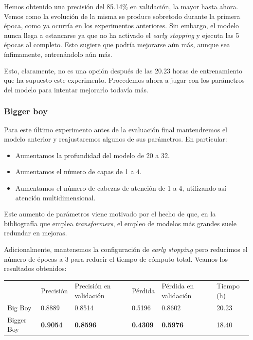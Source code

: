 \documentclass[a4paper, 20pt, dvipsnames]{article}
\begin{document}
Hemos obtenido una precisión del 85.14\% en validación, la mayor hasta ahora. Vemos como la evolución de la misma se produce sobretodo durante la primera época, como ya ocurría en los experimentos anteriores. Sin embargo, el modelo nunca llega a estancarse ya que no ha activado el \emph{early stopping} y ejecuta las 5 épocas al completo. Esto sugiere que podría mejorarse aún más, aunque sea ínfimamente, entrenándolo aún más.

Esto, claramente, no es una opción después de las 20.23 horas de entrenamiento que ha supuesto este experimento. Procedemos ahora a jugar con los parámetros del modelo para intentar mejorarlo todavía más.

\subsubsection{Bigger boy}

Para este último experimento antes de la evaluación final mantendremos el modelo
anterior y reajustaremos algunos de sus parámetros. En particular:

\begin{itemize}
\item Aumentamos la profundidad del modelo de 20 a 32.
\item Aumentamos el número de capas de 1 a 4.
\item Aumentamos el número de cabezas de atención de 1 a 4, utilizando así
  atención multidimensional.
\end{itemize}

Este aumento de parámetros viene motivado por el hecho de que, en la
bibliografía que emplea \emph{transformers}, el empleo de modelos más grandes
suele redundar en mejoras.

Adicionalmente, mantenemos la configuración de \emph{early stopping} pero
reducimos el número de épocas a 3 para reducir el tiempo de cómputo
total. Veamos los resultados obtenidos:

\begin{table}[H]
	\centering
	\begin{tabular}{llllll}
		& Precisión & Precisión en validación & Pérdida & Pérdida en validación & Tiempo (h) \\ \cline{2-6} 
		Big Boy    & 0.8889    & 0.8514                  & 0.5196  & 0.8602                & 20.23 \\
		Bigger Boy & \textbf{0.9054}    & \textbf{0.8596}                  & \textbf{0.4309}  & \textbf{0.5976}                & 18.40
	\end{tabular}
\end{table}
\end{document}
